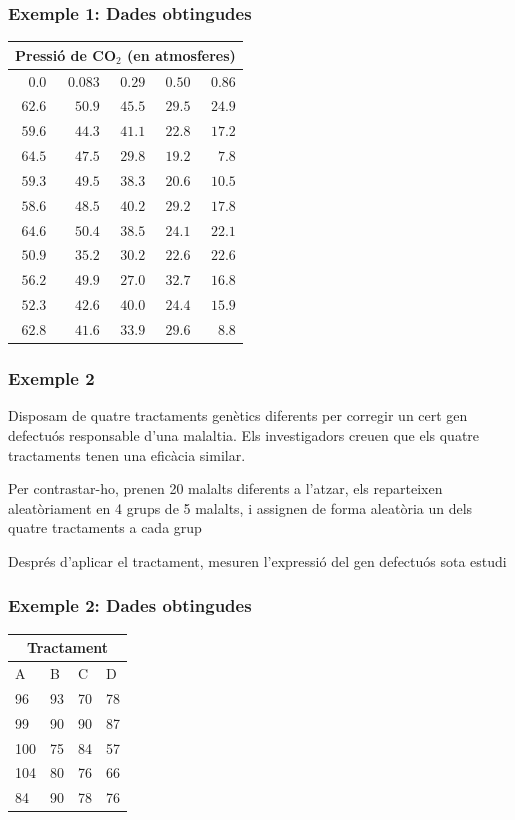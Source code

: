 \documentclass[12pt,t]{beamer}
\theoremstyle{plain}
\theoremstyle{definition}
\begin{document}
\begin{frame}
\frametitle{Exemple 1: Dades obtingudes}
\begin{center}
\begin{tabular}{rrrrr}
\multicolumn{5}{c}{Pressió de CO${}_2$ (en atmosferes)}\\\hline
$0.0$&$0.083$&$0.29$&$0.50$&$0.86$\\\hline
$62.6$&$50.9$&$45.5$&$29.5$&$24.9$\\
$59.6$&$44.3$&$41.1$&$22.8$&$17.2$\\
$64.5$&$47.5$&$29.8$&$19.2$&$7.8$\\
$59.3$&$49.5$&$38.3$&$20.6$&$10.5$\\
$58.6$&$48.5$&$40.2$&$29.2$&$17.8$\\
$64.6$&$50.4$&$38.5$&$24.1$&$22.1$\\
$50.9$&$35.2$&$30.2$&$22.6$&$22.6$\\
$56.2$&$49.9$&$27.0$&$32.7$&$16.8$\\
$52.3$&$42.6$&$40.0$&$24.4$&$15.9$\\
$62.8$&$41.6$&$33.9$&$29.6$&$8.8$\\
\end{tabular}
\end{center}
\end{frame}





\begin{frame}
\frametitle{Exemple 2}
Disposam de quatre tractaments genètics diferents per corregir un cert gen defectuós responsable d'una malaltia. Els investigadors creuen que els quatre tractaments tenen una eficàcia similar.
\medskip

Per contrastar-ho, prenen 20 malalts diferents a l'atzar, els reparteixen aleatòriament en 4 grups de 5 malalts, i assignen de forma aleatòria un dels quatre tractaments a cada grup
\medskip

Després d'aplicar el tractament, mesuren l'expressió del gen defectuós sota estudi



\end{frame}

\begin{frame}
\frametitle{Exemple 2: Dades obtingudes}
\begin{center}
\begin{tabular}{llll}
\multicolumn{4}{c}{Tractament}\\
\hline
A & B & C & D \\
\hline
96 & 93 & 70 &  78 \\
99 & 90 & 90 & 87 \\
100 & 75 & 84 & 57 \\
104 & 80 & 76 & 66  \\
84 & 90 & 78 & 76
\end{tabular}
\end{center}

\end{frame}
\end{document}
